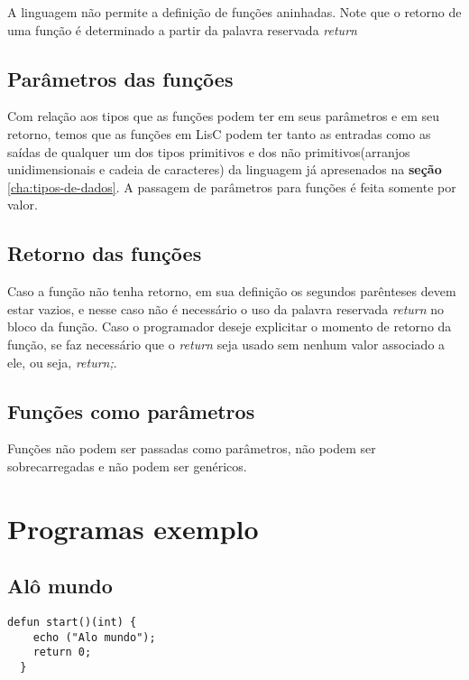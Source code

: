 \documentclass[
  12pt,				%
  oneside,			%
  a4paper,			%
  english,			%
  french,				%
  spanish,			%
  brazil,				%
]{abntex2}
\begin{document}
A linguagem não permite a definição de funções aninhadas. Note que o
retorno de uma função é determinado a partir da palavra reservada
\emph{return}

\section{Parâmetros das funções}
\label{sec:parametros-das-funções}

Com relação aos tipos que as funções podem ter em seus
parâmetros e em seu retorno, temos que as funções em LisC podem ter
tanto as entradas como as saídas de qualquer um dos tipos primitivos e
dos não primitivos(arranjos unidimensionais e cadeia de caracteres) da
linguagem já apresenados na \textbf{seção} \ref{cha:tipos-de-dados}. A
passagem de parâmetros para funções é feita somente por valor.

\section{Retorno das funções}
\label{sec:returno-das-funcoes}

Caso a função não tenha retorno, em sua definição os segundos parênteses
devem estar vazios, e nesse caso não é necessário o uso da palavra
reservada \emph{return} no bloco da função. Caso o programador deseje
explicitar o momento de retorno da função, se faz necessário que o
\emph{return} seja usado sem nenhum valor associado a ele, ou
seja, \emph{return;}.

\section{Funções como parâmetros}
\label{sec:funções-como-parametros}

Funções não podem ser passadas como parâmetros, não podem ser
sobrecarregadas e não podem ser genéricos.

\chapter{Programas exemplo}
\label{cha:programas-exemplo}

\section{Alô mundo}
\label{sec:alo-mundo}

\begin{lstlisting}[label=code:alo-mundo,caption=Programa Alô mundo]
  defun start()(int) {
    echo ("Alo mundo");
    return 0;
  }
\end{lstlisting}
\end{document}
